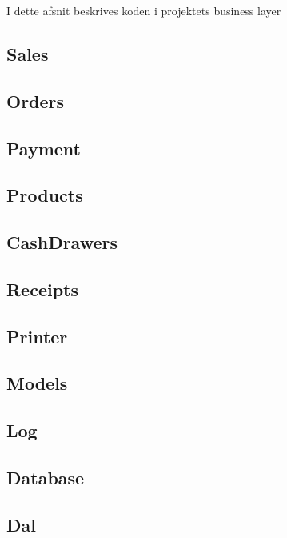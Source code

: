 I dette afsnit beskrives koden i projektets business layer
\subsection{Sales}
%

\subsection{Orders}
%

\subsection{Payment}
%

\subsection{Products}
%

\subsection{CashDrawers}
%

\subsection{Receipts}
%

\subsection{Printer}
%

\subsection{Models}
%

\subsection{Log}
%

\subsection{Database}
%

\subsection{Dal}
%

